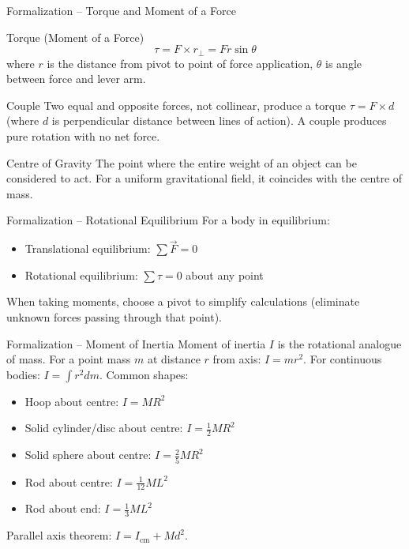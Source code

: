 \documentclass[11pt]{beamer}
\begin{document}
\begin{frame}{Formalization – Torque and Moment of a Force}
\begin{block}{Torque (Moment of a Force)}
\[\tau = F \times r_{\perp} = F r \sin\theta\]
where $r$ is the distance from pivot to point of force application, $\theta$ is angle between force and lever arm.
\end{block}
\begin{block}{Couple}
Two equal and opposite forces, not collinear, produce a torque $\tau = F \times d$ (where $d$ is perpendicular distance between lines of action). A couple produces pure rotation with no net force.
\end{block}
\begin{block}{Centre of Gravity}
The point where the entire weight of an object can be considered to act. For a uniform gravitational field, it coincides with the centre of mass.
\end{block}
\end{frame}

\begin{frame}{Formalization – Rotational Equilibrium}
For a body in equilibrium:
\begin{itemize}
    \item Translational equilibrium: $\sum \vec{F} = 0$
    \item Rotational equilibrium: $\sum \tau = 0$ about any point
\end{itemize}
When taking moments, choose a pivot to simplify calculations (eliminate unknown forces passing through that point).
\end{frame}

\begin{frame}{Formalization – Moment of Inertia}
Moment of inertia $I$ is the rotational analogue of mass. For a point mass $m$ at distance $r$ from axis: $I = mr^2$.
For continuous bodies: $I = \int r^2 dm$.
Common shapes:
\begin{itemize}
    \item Hoop about centre: $I = MR^2$
    \item Solid cylinder/disc about centre: $I = \frac12 MR^2$
    \item Solid sphere about centre: $I = \frac25 MR^2$
    \item Rod about centre: $I = \frac{1}{12} ML^2$
    \item Rod about end: $I = \frac13 ML^2$
\end{itemize}
Parallel axis theorem: $I = I_{\text{cm}} + M d^2$.
\end{frame}
\end{document}
